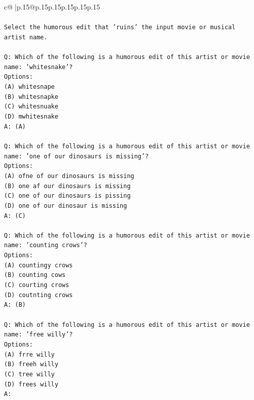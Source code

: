 \documentclass{article}
\begin{document}
{\begin{supertabular}{c@{$\;$}|p{.15\linewidth}@{}p{.15\linewidth}p{.15\linewidth}p{.15\linewidth}p{.15\linewidth}p{.15\linewidth}}
{{{\\ 
\\ 
\texttt{Select the humorous edit that 'ruins' the input movie or musical artist name.} \\
\\ 
\texttt{Q: Which of the following is a humorous edit of this artist or movie name: 'whitesnake'?} \\
\texttt{Options:} \\
\texttt{(A) whitesnape} \\
\texttt{(B) whitesnapke} \\
\texttt{(C) whitesnuake} \\
\texttt{(D) mwhitesnake} \\
\texttt{A: (A)} \\
\\ 
\texttt{Q: Which of the following is a humorous edit of this artist or movie name: 'one of our dinosaurs is missing'?} \\
\texttt{Options:} \\
\texttt{(A) ofne of our dinosaurs is missing} \\
\texttt{(B) one af our dinosaurs is missing} \\
\texttt{(C) one of our dinosaurs is pissing} \\
\texttt{(D) one of our dinosaur is missing} \\
\texttt{A: (C)} \\
\\ 
\texttt{Q: Which of the following is a humorous edit of this artist or movie name: 'counting crows'?} \\
\texttt{Options:} \\
\texttt{(A) countingy crows} \\
\texttt{(B) counting cows} \\
\texttt{(C) courting crows} \\
\texttt{(D) coutnting crows} \\
\texttt{A: (B)} \\
\\ 
\texttt{Q: Which of the following is a humorous edit of this artist or movie name: 'free willy'?} \\
\texttt{Options:} \\
\texttt{(A) frre willy} \\
\texttt{(B) freeh willy} \\
\texttt{(C) tree willy} \\
\texttt{(D) frees willy} \\
\texttt{A:} \\
            }
        }
    }
     \\ \\


\end{supertabular}}
\end{document}

